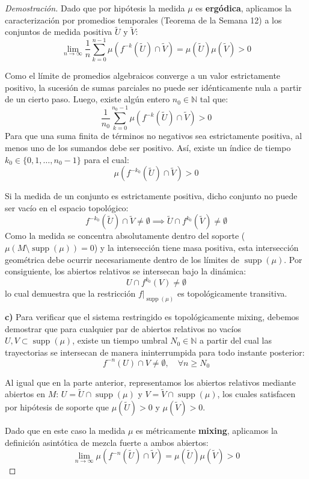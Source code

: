 \begin{proof}[Demostración]
	Dado que por hipótesis la medida $\mu$ es \textbf{ergódica}, aplicamos la caracterización por promedios temporales (Teorema de la Semana 12) a los conjuntos de medida positiva $\tilde{U}$ y $\tilde{V}$:
	$$ \lim_{n \to \infty} \frac{1}{n} \sum_{k=0}^{n-1} \mu(f^{-k}(\tilde{U}) \cap \tilde{V}) = \mu(\tilde{U})\mu(\tilde{V}) > 0 $$
	
	Como el límite de promedios algebraicos converge a un valor estrictamente positivo, la sucesión de sumas parciales no puede ser idénticamente nula a partir de un cierto paso. Luego, existe algún entero $n_0 \in \mathbb{N}$ tal que:
	$$ \frac{1}{n_0} \sum_{k=0}^{n_0-1} \mu(f^{-k}(\tilde{U}) \cap \tilde{V}) > 0 $$
	Para que una suma finita de términos no negativos sea estrictamente positiva, al menos uno de los sumandos debe ser positivo. Así, existe un índice de tiempo $k_0 \in \{0, 1, \dots, n_0-1\}$ para el cual:
	$$ \mu(f^{-k_0}(\tilde{U}) \cap \tilde{V}) > 0 $$
	
	Si la medida de un conjunto es estrictamente positiva, dicho conjunto no puede ser vacío en el espacio topológico:
	$$ f^{-k_0}(\tilde{U}) \cap \tilde{V} \neq \emptyset \implies \tilde{U} \cap f^{k_0}(\tilde{V}) \neq \emptyset $$
	Como la medida se concentra absolutamente dentro del soporte ($\mu(M \setminus \operatorname{supp}(\mu)) = 0$) y la intersección tiene masa positiva, esta intersección geométrica debe ocurrir necesariamente dentro de los límites de $\operatorname{supp}(\mu)$. Por consiguiente, los abiertos relativos se intersecan bajo la dinámica:
	$$ U \cap f^{k_0}(V) \neq \emptyset $$
	lo cual demuestra que la restricción $f|_{\operatorname{supp}(\mu)}$ es topológicamente transitiva.
	
	\textbf{c)} Para verificar que el sistema restringido es topológicamente mixing, debemos demostrar que para cualquier par de abiertos relativos no vacíos $U, V \subset \operatorname{supp}(\mu)$, existe un tiempo umbral $N_0 \in \mathbb{N}$ a partir del cual las trayectorias se intersecan de manera ininterrumpida para todo instante posterior:
	$$ f^{-n}(U) \cap V \neq \emptyset, \quad \forall n \ge N_0 $$
	
	Al igual que en la parte anterior, representamos los abiertos relativos mediante abiertos en $M$: $U = \tilde{U} \cap \operatorname{supp}(\mu)$ y $V = \tilde{V} \cap \operatorname{supp}(\mu)$, los cuales satisfacen por hipótesis de soporte que $\mu(\tilde{U}) > 0$ y $\mu(\tilde{V}) > 0$.
	
	Dado que en este caso la medida $\mu$ es métricamente \textbf{mixing}, aplicamos la definición asintótica de mezcla fuerte a ambos abiertos:
	$$ \lim_{n \to \infty} \mu(f^{-n}(\tilde{U}) \cap \tilde{V}) = \mu(\tilde{U})\mu(\tilde{V}) > 0 $$
	

\end{proof}
